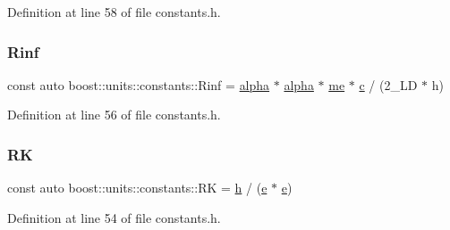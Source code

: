 Definition at line 58 of file constants.\+h.

\hypertarget{namespaceboost_1_1units_1_1constants_aa844355040afd1c8f03da6a4c6cedd08}{}\label{namespaceboost_1_1units_1_1constants_aa844355040afd1c8f03da6a4c6cedd08} 
\subsubsection{\texorpdfstring{Rinf}{Rinf}}
{\footnotesize\ttfamily const auto boost\+::units\+::constants\+::\+Rinf = \hyperlink{namespaceboost_1_1units_1_1constants_a405a220a4d6ab3135e0c6b53036eeb32}{alpha} $\ast$ \hyperlink{namespaceboost_1_1units_1_1constants_a405a220a4d6ab3135e0c6b53036eeb32}{alpha} $\ast$ \hyperlink{namespaceboost_1_1units_1_1constants_ae2a04958a1975830e160ad479847dc3c}{me} $\ast$ \hyperlink{namespaceboost_1_1units_1_1constants_a1e4c07de84b2d43e7717eaada50b32de}{c} / (2\+\_\+\+L\+D $\ast$ h)}



Definition at line 56 of file constants.\+h.

\hypertarget{namespaceboost_1_1units_1_1constants_accaa4e5c456ccb77c59dcc3a08dfdb13}{}\label{namespaceboost_1_1units_1_1constants_accaa4e5c456ccb77c59dcc3a08dfdb13} 
\subsubsection{\texorpdfstring{RK}{RK}}
{\footnotesize\ttfamily const auto boost\+::units\+::constants\+::\+RK = \hyperlink{namespaceboost_1_1units_1_1constants_a744f5a50efb6701fcbde9527affd7776}{h} / (\hyperlink{namespaceboost_1_1units_1_1constants_a0e10024b337b34c7f7300c67f0e9fcb1}{e} $\ast$ \hyperlink{namespaceboost_1_1units_1_1constants_a0e10024b337b34c7f7300c67f0e9fcb1}{e})}



Definition at line 54 of file constants.\+h.

\hypertarget{namespaceboost_1_1units_1_1constants_af083974ac792b5782a33f287fadffacb}{}\label{namespaceboost_1_1units_1_1constants_af083974ac792b5782a33f287fadffacb} 
